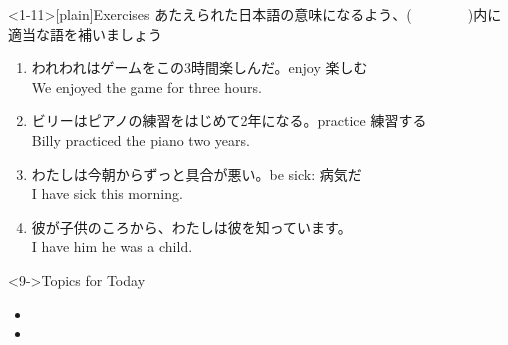 \documentclass[aspectratio=169,xcolor={dvipsnames,table}]{beamer}
\newcommand{\myaudio}[1]{\href{#1}{\faVolumeUp}}
\begin{document}
\begin{frame}<1-11>[plain]{Exercises}
あたえられた日本語の意味になるよう、(~~~~~~~~)内に適当な語を補いましょう\mbox{}\hfill{\scriptsize \myaudio{./audio/012_have_pp_keizoku_05.mp3}}

\begin{enumerate}
 \item {\small われわれはゲームをこの3時間楽しんだ。}\hfill{}{\scriptsize enjoy  楽しむ}\\
We  enjoyed the game for three hours. \item {\small ビリーはピアノの練習をはじめて2年になる。}\hfill{}{\scriptsize practice  練習する}\\
Billy  practiced the piano  two years.
 \item {\small わたしは今朝からずっと具合が悪い。}\hfill{}{\scriptsize be sick: 病気だ}\\
I have  sick  this morning.\hfill{}
 \item {\small 彼が子供のころから、わたしは彼を知っています。}\\
I have  him  he was a child.\hfill{}
\end{enumerate}

\begin{exampleblock}<9->{Topics for Today}\small
\begin{itemize}[square]
 \item {}
 \item {}

\end{itemize}
      \end{exampleblock}
\end{frame}
\end{document}
